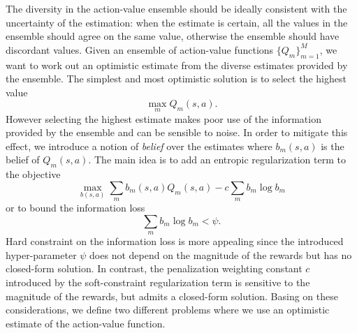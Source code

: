 The diversity in the action-value ensemble should be ideally consistent with the uncertainty of the estimation: when the estimate is certain, all the values in the ensemble should agree on the same value, otherwise the ensemble should have discordant values.
Given an ensemble of action-value functions $\{Q_m\}_{m=1}^M$, we want to work out an optimistic estimate from the diverse estimates provided by the ensemble. The simplest and most optimistic solution is to select the highest value
\begin{equation}
 \max_m Q_m(s,a).
\end{equation}
However selecting the highest estimate makes poor use of the information provided by the ensemble and can be sensible to noise. In order to mitigate this effect, we introduce a notion of \textit{belief} over the estimates where $b_m(s,a)$ is the belief of $Q_m(s,a)$. The main idea is to add an entropic regularization term to the objective
\begin{equation}
 \max_{b(s,a)} \sum_m b_m(s,a) Q_m(s,a) - c \sum_{m} b_m \log b_m
\end{equation}
or to bound the information loss
\begin{equation}
\sum_m b_m \log b_m < \psi.
\end{equation}
Hard constraint on the information loss is more appealing since the introduced hyper-parameter $\psi$ does not depend on the magnitude of the rewards but has no closed-form solution. In contrast, the penalization weighting constant $c$ introduced by the soft-constraint regularization term is sensitive to the magnitude of the rewards, but admits a closed-form solution.
Basing on these considerations, we define two different problems where we use an optimistic estimate of the action-value function.

